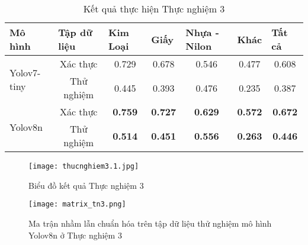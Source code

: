 \documentclass[../the.tex]{subfiles}
\begin{document}
\begin{table}[h!]
    \centering
    \caption{Kết quả thực hiện Thực nghiệm 3}
    \begin{tabular}{|l|c|c|c|c|c|c|}
        \hline
        \textbf{Mô hình}             & \multicolumn{1}{l|}{\textbf{Tập dữ liệu}} & \multicolumn{1}{l|}{\textbf{Kim Loại}} & \multicolumn{1}{l|}{\textbf{Giấy}} & \multicolumn{1}{l|}{\textbf{Nhựa - Nilon}} & \multicolumn{1}{l|}{\textbf{Khác}} & \multicolumn{1}{l|}{\textbf{Tất cả}} \\ \hline
        \multirow{2}{*}{Yolov7-tiny} & Xác thực                                  & 0.729                                 & 0.678                              & 0.546                                      & 0.477                             & 0.608                                \\ \cline{2-7}
                                     & Thử nghiệm                                & 0.445                                   & 0.393                              & 0.476                                      & 0.235                              & 0.387                                \\ \hline
        \multirow{2}{*}{Yolov8n}     & Xác thực                                  & \textbf{0.759}                         & \textbf{0.727}                     & \textbf{0.629}                             & \textbf{0.572}                     & \textbf{0.672}                       \\ \cline{2-7}
                                     & Thử nghiệm                                & \textbf{0.514}                         & \textbf{0.451}                     & \textbf{0.556}                             & \textbf{0.263}                     & \textbf{0.446}                       \\ \hline
    \end{tabular}
    \label{tab:thucnghiem3.1}
\end{table}

\begin{figure}[H]
    \centering
    \texttt{[image: thucnghiem3.1.jpg]}
    \caption{Biểu đồ kết quả Thực nghiệm 3}
    \label{fig:thucnghiem3}
\end{figure}

\begin{figure}[H]
    \centering
    \texttt{[image: matrix\_tn3.png]}
    \caption{Ma trận nhầm lẫn chuẩn hóa trên tập dữ liệu thử nghiệm mô hình Yolov8n ở Thực nghiệm 3}
    \label{fig:thucnghiem3.1}
\end{figure}
\end{document}
